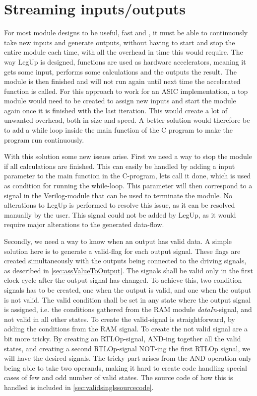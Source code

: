 \section{Streaming inputs/outputs}
For most module designs to be useful, fast and , it must be able to continuously take new inputs and generate outputs, without having to start and stop the entire module each time, with all the overhead in time this would require. The way LegUp is designed, functions are used as hardware accelerators, meaning it gets some input, performs some calculations and the outputs the result. The module is then finished and will not run again until next time the accelerated function is called. For this approach to work for an ASIC implementation, a top module would need to be created to assign new inputs and start the module again once it is finished with the last iteration. This would create a lot of unwanted overhead, both in size and speed. A better solution would therefore be to add a while loop inside the main function of the C program to make the program run continuously.

With this solution some new issues arise. 
First we need a way to stop the module if all calculations are finished. This can easily be handled by adding a input parameter to the main function in the C-program, lets call it done, which is used as condition for running the while-loop. This parameter will then correspond to a signal in the Verilog-module that can be used to terminate the module. No alterations to LegUp is performed to resolve this issue, as it can be resolved manually by the user. This signal could not be added by LegUp, as it would require major alterations to the generated data-flow.

Secondly, we need a way to know when an output has valid data. A simple solution here is to generate a valid-flag for each output signal. These flags are created simultaneously with the outputs being connected to the driving signals, as described in \ref{sec:assValueToOutput}. The signals shall be valid only in the first clock cycle after the output signal has changed. To achieve this, two condition signals has to be created, one when the output is valid, and one when the output is not valid. The valid condition shall be set in any state where the output signal is assigned, i.e. the conditions gathered from the RAM module \textit{dataIn}-signal, and not valid in all other states. To create the valid-signal is straightforward, by adding the conditions from the RAM signal. To create the not valid signal are a bit more tricky. By creating an RTLOp-signal, AND-ing together all the valid states, and creating a second RTLOp-signal NOT-ing the first RTLOp signal, we will have the desired signals. The tricky part arises from the AND operation only being able to take two operands, making it hard to create code handling special cases of few and odd number of valid states. The source code of how this is handled is included in \cref{sec:validsinglssourcecode}.


